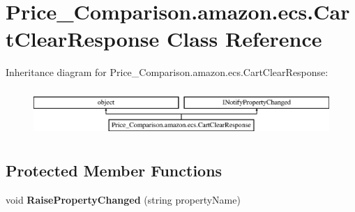 \hypertarget{class_price___comparison_1_1amazon_1_1ecs_1_1_cart_clear_response}{\section{Price\-\_\-\-Comparison.\-amazon.\-ecs.\-Cart\-Clear\-Response Class Reference}
\label{class_price___comparison_1_1amazon_1_1ecs_1_1_cart_clear_response}
}


 


Inheritance diagram for Price\-\_\-\-Comparison.\-amazon.\-ecs.\-Cart\-Clear\-Response\-:\begin{figure}[H]
\begin{center}
\leavevmode
\includegraphics[height=1.812298cm]{class_price___comparison_1_1amazon_1_1ecs_1_1_cart_clear_response}
\end{center}
\end{figure}
\subsection*{Protected Member Functions}
\begin{DoxyCompactItemize}
\item 
\hypertarget{class_price___comparison_1_1amazon_1_1ecs_1_1_cart_clear_response_a9cb3ac0bfb4cd67f57873d2e1f205cd0}{void {\bfseries Raise\-Property\-Changed} (string property\-Name)}\label{class_price___comparison_1_1amazon_1_1ecs_1_1_cart_clear_response_a9cb3ac0bfb4cd67f57873d2e1f205cd0}

\end{DoxyCompactItemize}
